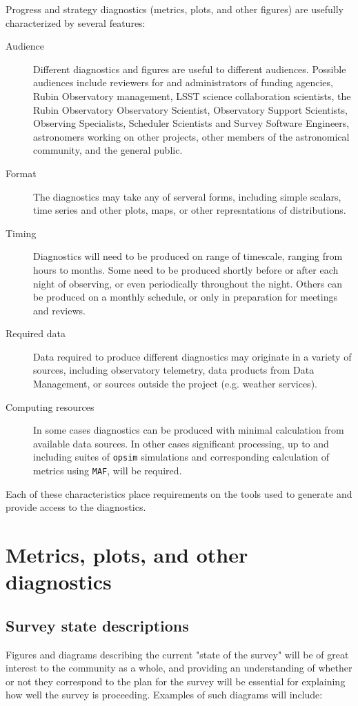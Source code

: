 Progress and strategy diagnostics (metrics, plots, and other figures) are usefully characterized by several features:
\begin{description}
\item[{Audience}] Different diagnostics and figures are useful to different audiences. Possible audiences include reviewers for and administrators of funding agencies, Rubin Observatory management, LSST science collaboration scientists, the Rubin Observatory Observatory Scientist, Observatory Support Scientists, Observing Specialists, Scheduler Scientists and Survey Software Engineers, astronomers working on other projects, other members of the astronomical community, and the general public.
\item[{Format}] The diagnostics may take any of serveral forms, including simple scalars, time series and other plots, maps, or other represntations of distributions.
\item[{Timing}] Diagnostics will need to be produced on range of timescale, ranging from hours to months. Some need to be produced shortly before or after each night of observing, or even periodically throughout the night. Others can be produced on a monthly schedule, or only in preparation for meetings and reviews.
\item[{Required data}] Data required to produce different diagnostics may originate in a variety of sources, including observatory telemetry, data products from Data Management, or sources outside the project (e.g. weather services).
\item[{Computing resources}] In some cases diagnostics can be produced with minimal calculation from available data sources. In other cases significant processing, up to and including suites of \texttt{opsim} simulations and corresponding calculation of metrics using \texttt{MAF}, will be required.
\end{description}

Each of these characteristics place requirements on the tools used to generate and provide access to the diagnostics.

\section{Metrics, plots, and other diagnostics}
\label{sec:org1ea54ba}
\subsection{Survey state descriptions}
\label{sec:org6c8f34c}
Figures and diagrams describing the current "state of the survey" will be of great interest to the community as a whole, and providing an understanding of whether or not they correspond to the plan for the survey will be essential for explaining how well the survey is proceeding.
Examples of such diagrams will include:

